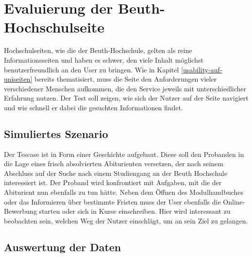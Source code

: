 %
%
%
%

\section{Evaluierung der Beuth-Hochschulseite}

Hochschulseiten, wie die der Beuth-Hochschule, gelten als reine Informationsseiten und haben es schwer, den viele Inhalt möglichst benutzerfreundlich an den User zu bringen. Wie in Kapitel \ref{usability-auf-uniseiten} bereits thematisiert, muss die Seite den Anforderungen vieler verschiedener Menschen aufkommen, die den Service jeweils mit unterschiedlicher Erfahrung nutzen. Der Test soll zeigen, wie sich der Nutzer auf der Seite navigiert und wie schnell er dabei die gesuchten Informationen findet.

\subsection{Simuliertes Szenario}

Der Tescase ist in Form einer Geschichte aufgebaut. Diese soll den Probanden in die Lage eines frisch absolvierten Abiturienten versetzen, der nach seinem Abschluss auf der Suche nach einem Studiengang an der Beuth Hochschule interessiert ist. Der Proband wird konfrontiert mit Aufgaben, mit die der Abiturient nun ebenfalls zu tun hätte. Neben dem Öffnen des Modulhandbuches oder das Informieren über bestimmte Fristen muss der User ebenfalls die Online-Bewerbung starten oder sich in Kurse einschreiben. Hier wird interessant zu beobachten sein, welchen Weg der Nutzer einschlägt, um an sein Ziel zu gelangen.

\subsection{Auswertung der Daten}

